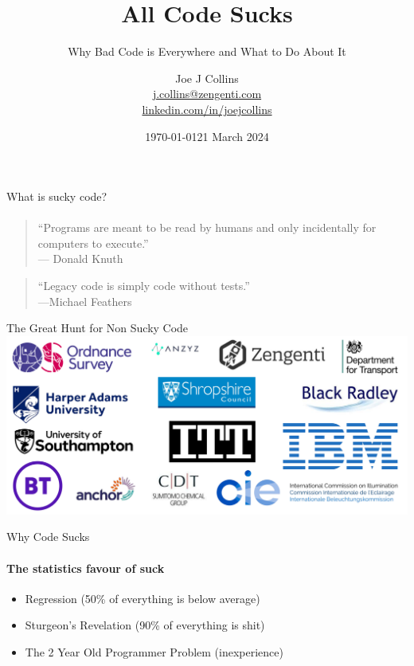 \documentclass[bigger]{beamer}
\begin{document}
\title{All Code Sucks}
\subtitle{Why Bad Code is Everywhere and What to Do About It}

\author{Joe J Collins \\
  \href{mailto:j.collins@zengenti.com}{j.collins@zengenti.com} \\
  \href{https://linkedin.com/in/joejcollins}{linkedin.com/in/joejcollins}
}


\date{\today}
\date{21 March 2024}

\frame{\titlepage}



\begin{frame}{What is sucky code?}
  \framesubtitle{}
  \begin{quote}
    ``Programs are meant to be read by humans and
    only incidentally for computers to execute.''\\
    \hfill --- Donald Knuth
  \end{quote}
  \bigskip
  \begin{quote}
    ``Legacy code is simply code without tests.''\\
    \hfill ---Michael Feathers
  \end{quote}
\end{frame}

\begin{frame}{The Great Hunt for Non Sucky Code}
  \includegraphics[width=\textwidth]{images/companies.png}
\end{frame}

\begin{frame}{Why Code Sucks}
  \framesubtitle{The statistics favour of suck}
  \begin{itemize}
    \item Regression (50\% of everything is below average)
          \pause
    \item Sturgeon's Revelation (90\% of everything is shit)
          \pause
    \item The 2 Year Old Programmer Problem (inexperience)
  \end{itemize}
\end{frame}
\end{document}
